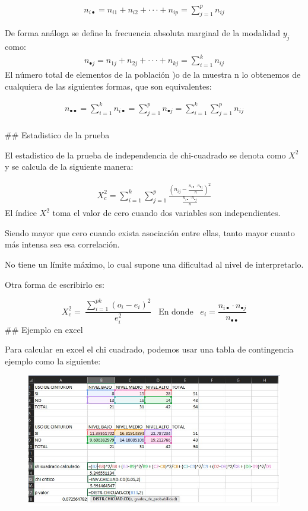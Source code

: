 \documentclass[twocolumn]{article}
\begin{document}
\[
\begin{array}{c}
n_{i\bullet} = n_{i1} + n_{i2} + \cdot \cdot \cdot + n_{ip} = \sum_{j=1}^p n_{ij}
\end{array}
\]

De forma análoga se define la frecuencia absoluta marginal de la
modalidad \(y_j\) como: \[
\begin{array}{c}
n_{\bullet j} = n_{1j} + n_{2j} + \cdot \cdot \cdot + n_{kj} = \sum_{i=1}^k n_{ij}
\end{array}
\] El número total de elementos de la población )o de la muestra n lo
obtenemos de cualquiera de las siguientes formas, que son equivalentes:

\[
\begin{array}{c}
n_{\bullet \bullet} = \sum_{i=1}^k n_{i \bullet} = \sum_{j=1}^p n_{ \bullet j} = \sum_{i=1}^k \sum_{j=1}^p n_{ij}
\end{array}
\]\\
\#\# Estadistico de la prueba

El estadistico de la prueba de independencia de chi-cuadrado se denota
como \(X^2\) y se calcula de la siguiente manera:

\[
\begin{array}{c}
X^2_c = \sum_{i=1}^k \sum_{j=1}^p \frac{\left( n_{ij} - \frac{n_{i \bullet} \cdot n_{\bullet j}}{n} \right)^2}{\frac{n_{i \bullet} \cdot n_{\bullet j}}{n}}
\end{array}
\] El índice \(X^2\) toma el valor de cero cuando dos variables son
independientes.

Siendo mayor que cero cuando exista asociación entre ellas, tanto mayor
cuanto más intensa sea esa correlación.

No tiene un límite máximo, lo cual supone una dificultad al nivel de
interpretarlo.

Otra forma de escribirlo es:

\[
X^2_c =\ \frac{\sum_{i =1}^{pk}  (o_i-e_i)^2}{e_i^2}\;\;\;\text{En donde}\;\;\; e_i = \frac{n_{i\bullet} \cdot n_{\bullet j}}{n_{\bullet \bullet}}
\] \#\# Ejemplo en excel

Para calcular en excel el chi cuadrado, podemos usar una tabla de
contingencia ejemplo como la siguiente:

\begin{figure}
\centering
\includegraphics{./img/ejemploChiCuadrado.jpg}
\caption{}
\end{figure}
\end{document}
